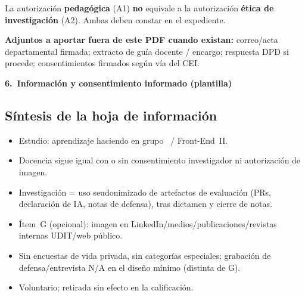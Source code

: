 \documentclass[11pt,a4paper]{scrartcl}
\newcommand{\AnnexTitle}[1]{%
  \clearpage
  \LogoRow
  \begin{center}{\Large\sffamily\bfseries #1}\end{center}
  \vspace{0.4em}
  \noindent{\color{rulegray}\hrule height 0.4pt}
  \vspace{0.5em}
}
\begin{document}
\vspace{0.5em}
\noindent
La autorización \textbf{pedagógica} (A1) \textbf{no} equivale a la autorización
\textbf{ética de investigación} (A2). Ambas deben constar en el expediente.

\noindent\textbf{Adjuntos a aportar fuera de este PDF cuando existan:}
correo/acta departamental firmada; extracto de guía docente / encargo;
respuesta DPD si procede; consentimientos firmados según vía del CEI.

\AnnexTitle{6.\ Información y consentimiento informado (plantilla)}


\subsection*{Síntesis de la hoja de información}
\begin{itemize}
  \item Estudio: aprendizaje haciendo en grupo \TTODfull\ / Front-End~II.
  \item Docencia sigue igual con o sin consentimiento investigador ni autorización de imagen.
  \item Investigación = uso seudonimizado de artefactos de evaluación (PRs,
        declaración de IA, notas de defensa), tras dictamen y cierre de notas.
  \item Ítem~G (opcional): imagen en LinkedIn/medios/publicaciones/revistas internas UDIT/web público.
  \item Sin encuestas de vida privada, sin categorías especiales; grabación de
        defensa/entrevista N/A en el diseño mínimo (distinta de G).
  \item Voluntario; retirada sin efecto en la calificación.
\end{itemize}

\vspace{0.3em}
\AuthoritiesBlock
\end{document}
